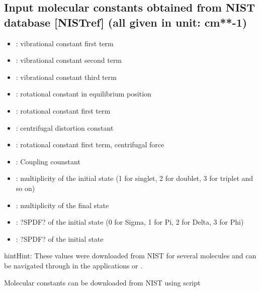 \documentclass[letterpaper,10pt,english]{sphinxmanual}
\begin{document}
\subsection{Input molecular constants obtained from NIST database {[}NISTref{]} (all given in unit: cm**-1)}
\label{\detokenize{convmol:input-molecular-constants-obtained-from-nist-database-nistref-all-given-in-unit-cm-1}}\begin{itemize}
\item {} 
: vibrational constant \textendash{} first term

\item {} 
: vibrational constant \textendash{} second term

\item {} 
: vibrational constant \textendash{} third term

\item {} 
: rotational constant in equilibrium position

\item {} 
: rotational constant \textendash{} first term

\item {} 
: centrifugal distortion constant

\item {} 
: rotational constant \textendash{} first term, centrifugal force

\item {} 
: Coupling counstant

\item {} 
: multiplicity of the initial state (1 for singlet, 2 for doublet, 3 for triplet and so on)

\item {} 
: multiplicity of the final state

\item {} 
: ?SPDF? of the initial state (0 for Sigma, 1 for Pi, 2 for Delta, 3 for Phi)

\item {} 
: ?SPDF? of the initial state

\end{itemize}

\begin{sphinxadmonition}{hint}{Hint:}
These values were downloaded from NIST for several molecules and can be navigated through in the applications  or .

Molecular constants can be downloaded from NIST using script 
\end{sphinxadmonition}
\end{document}
